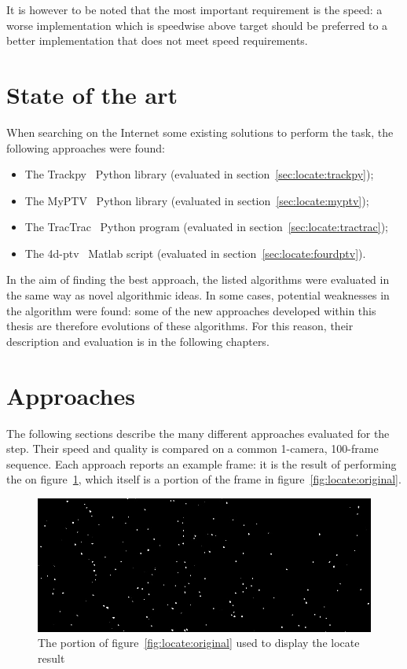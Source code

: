 It is however to be noted that the most important requirement is the speed: a worse implementation which is speedwise above target should be preferred to a better implementation that does not meet speed requirements.

\section{State of the art}

When searching on the Internet some existing solutions to perform the \locate* task, the following approaches were found:
\begin{itemize}
	\itemsep 0em
	\item The Trackpy~\cite{trackpy} Python library (evaluated in section~\ref{sec:locate:trackpy});
	\item The MyPTV~\cite{myptv} Python library (evaluated in section~\ref{sec:locate:myptv});
	\item The TracTrac~\cite{tractrac} Python program (evaluated in section~\ref{sec:locate:tractrac});
	\item The 4d-ptv~\cite{fourdptv} Matlab script (evaluated in section~\ref{sec:locate:fourdptv}).
\end{itemize}
In the aim of finding the best approach, the listed algorithms were evaluated in the same way as novel algorithmic ideas.
In some cases, potential weaknesses in the algorithm were found: some of the new approaches developed within this thesis are therefore evolutions of these algorithms.
For this reason, their description and evaluation is in the following chapters.

\section{Approaches}
\label{sec:locate:approaches}

The following sections describe the many different approaches evaluated for the \locate* step.
Their speed and quality is compared on a common 1-camera, 100-frame sequence.
Each approach reports an example frame: it is the result of performing the \locate* on figure~\ref{fig:locate:original-crop}, which itself is a portion of the frame in figure~\ref{fig:locate:original}.

\begin{figure}[H]
	\centerline{\includegraphics[width=\locateimgsize]{images/locate/_original-frame.png}}
	\caption{\centering The portion of figure~\ref{fig:locate:original} used to display the locate result}
	\label{fig:locate:original-crop}
\end{figure}


